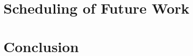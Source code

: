 \documentclass[runningheads,a4paper]{llncs}
\begin{document}

\section{Scheduling of Future Work}\label{sec:schedule}

%

\section{Conclusion}\label{sec:conclusion}

%

\end{document}

